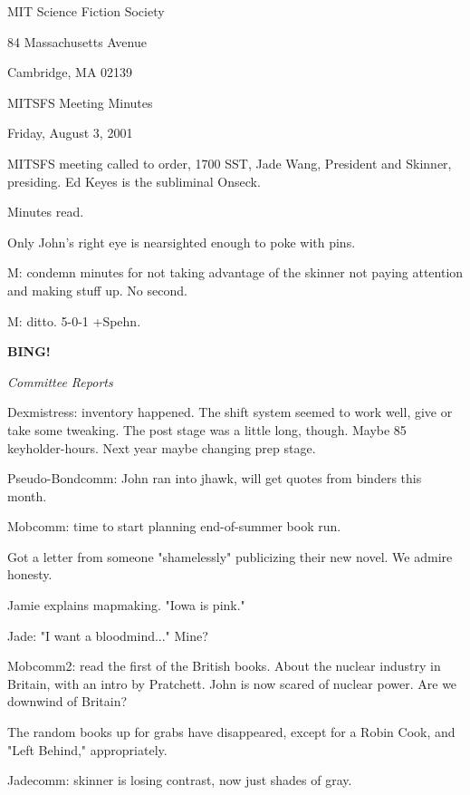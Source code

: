 \documentclass[12pt]{article}
\newcommand{\bing}{{\bf BING!} }
\newcommand{\goto}[1]{\bing \vskip 12pt \centerline{{\em{#1}}}}
\begin{document}
\begin{center}

MIT Science Fiction Society 

84 Massachusetts Avenue

Cambridge, MA 02139

\vspace{12pt}

MITSFS Meeting Minutes 

Friday, August 3, 2001

\end{center}
 
\vspace{18pt}

\setlength{\parskip}{6pt}

\noindent
MITSFS meeting called to order, 1700 SST, Jade Wang, President and
Skinner, presiding.  Ed Keyes is the subliminal Onseck.

Minutes read.

Only John's right eye is nearsighted enough to poke with pins.

M: condemn minutes for not taking advantage of the skinner not paying attention and making stuff up. No second.

M: ditto. 5-0-1 +Spehn.

\goto{Committee Reports}

Dexmistress: inventory happened. The shift system seemed to work well, give or take some tweaking. The post stage was a little long, though. Maybe 85 keyholder-hours. Next year maybe changing prep stage.

Pseudo-Bondcomm: John ran into jhawk, will get quotes from binders this month.

Mobcomm: time to start planning end-of-summer book run.

Got a letter from someone "shamelessly" publicizing their new novel. We admire honesty.

Jamie explains mapmaking. "Iowa is pink."

Jade: "I want a bloodmind..." Mine?

Mobcomm2: read the first of the British books. About the nuclear industry in Britain, with an intro by Pratchett. John is now scared of nuclear power. Are we downwind of Britain?

The random books up for grabs have disappeared, except for a Robin Cook, and "Left Behind," appropriately.

Jadecomm: skinner is losing contrast, now just shades of gray.
\end{document}
